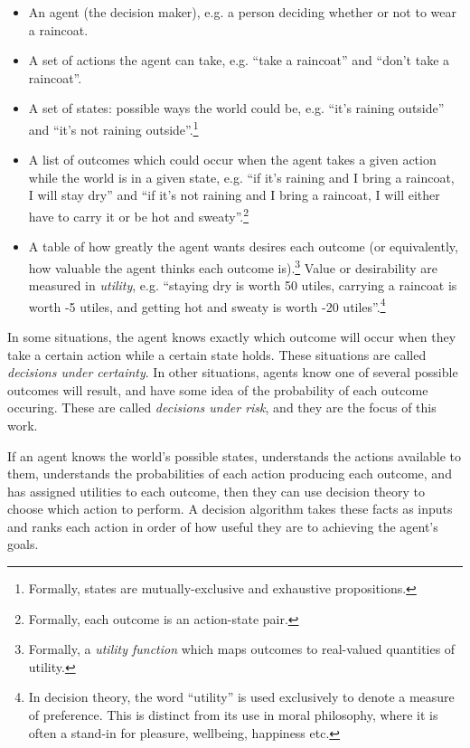 \documentclass{article}
\begin{document}
\begin{itemize}  
\item An agent (the decision maker), e.g. a person deciding whether or not to wear a raincoat.
\item A set of actions the agent can take, e.g. ``take a raincoat'' and ``don't take a raincoat''.
\item A set of states: possible ways the world could be, e.g. ``it's raining outside'' and ``it's not raining outside''.\footnote{Formally, states are mutually-exclusive and exhaustive propositions.}
\item A list of outcomes which could occur when the agent takes a given action while the world is in a given state, e.g. ``if it's raining and I bring a raincoat, I will stay dry'' and ``if it's not raining and I bring a raincoat, I will either have to carry it or be hot and sweaty''.\footnote{Formally, each outcome is an action-state pair.}
\item A table of how greatly the agent wants desires each outcome (or equivalently, how valuable the agent thinks each outcome is).\footnote{Formally, a \textit{utility function} which maps outcomes to real-valued quantities of utility.} Value or desirability are measured in \textit{utility}, e.g. ``staying dry is worth 50 utiles, carrying a raincoat is worth -5 utiles, and getting hot and sweaty is worth -20 utiles''.\footnote{In decision theory, the word ``utility'' is used exclusively to denote a measure of preference. This is distinct from its use in moral philosophy, where it is often a stand-in for pleasure, wellbeing, happiness etc.}
\end{itemize}

In some situations, the agent knows exactly which outcome will occur when they take a certain action while a certain state holds. These situations are called \textit{decisions under certainty}. In other situations, agents know one of several possible outcomes will result, and have some idea of the probability of each outcome occuring. These are called \textit{decisions under risk}, and they are the focus of this work.

If an agent knows the world's possible states, understands the actions available to them, understands the probabilities of each action producing each outcome, and has assigned utilities to each outcome, then they can use decision theory to choose which action to perform. A decision algorithm takes these facts as inputs and ranks each action in order of how useful they are to achieving the agent's goals. 
\end{document}
